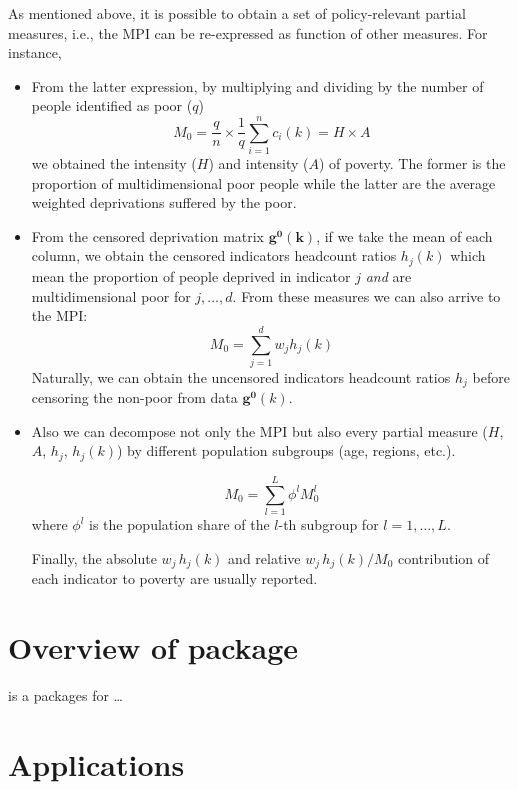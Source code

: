 As mentioned above, it is possible to obtain a set of policy-relevant partial measures, i.e., the MPI can be re-expressed as function of other measures. For instance,

\begin{itemize}
\item From the latter expression, by multiplying and dividing by the number of people identified as poor ($q$)
\[M_0 = \frac{q}{n} \times \frac{1}{q}\sum_{i=1}^n c_i(k) = H \times A \]
we obtained the intensity ($H$) and intensity ($A$) of poverty. The former is the proportion of multidimensional poor people while the latter are the average weighted deprivations suffered by the poor. 

\item From the censored deprivation matrix $\mathbf{g^0(k)}$, if we take the mean of each column, we obtain the censored indicators headcount ratios $h_j(k)$ which mean the proportion of people deprived in indicator $j$ \emph{and} are multidimensional poor for $j,\ldots,d$. From these measures we can also arrive to the MPI:
\[M_0 = \sum_{j=1}^{d} w_j h_j(k)  \]
Naturally, we can obtain the uncensored indicators headcount ratios $h_j$ before censoring the non-poor from data $\mathbf{g^0}(k)$.

\item Also we can decompose not only the MPI but also every partial measure ($H$, $A$, $h_j$, $h_j(k)$) by different population subgroups (age, regions, etc.). 

\[ M_0 = \sum_{l=1}^L \phi^l M_0^l\] where $\phi^l$ is the population share of the $l$-th subgroup for $l =1, \ldots, L$.

Finally, the absolute $w_j \, h_j(k)$ and relative $w_j \, h_j(k)/M_0$ contribution of each indicator to poverty are usually reported.







\end{itemize}

\hypertarget{overview-of-package}{%
\section{\texorpdfstring{Overview of  package}{Overview of  package}}\label{overview-of-package}}

 is a packages for \ldots{}

\hypertarget{applications}{%
\section{Applications}\label{applications}}

